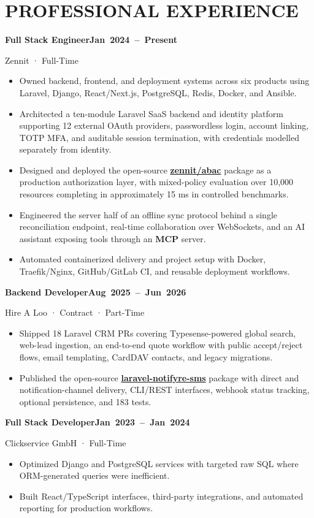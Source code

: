 \documentclass[10pt,a4paper]{article}
\newcommand{\entry}[2]{\Needspace{5\baselineskip}\par\addvspace{5pt}\noindent\textbf{#1}\hfill\mbox{\textbf{#2}}\par}
\newcommand{\job}[3]{\entry{#1}{#2}\vspace{-\parskip}#3\par}
\begin{document}
\section*{PROFESSIONAL EXPERIENCE}
\job{Full Stack Engineer}{Jan 2024 – Present}{Zennit · Full-Time}
\begin{itemize}
  \item Owned backend, frontend, and deployment systems across six products using Laravel, Django, React/Next.js, PostgreSQL, Redis, Docker, and Ansible.
  \item Architected a ten-module Laravel SaaS backend and identity platform supporting 12 external OAuth providers, passwordless login, account linking, TOTP MFA, and auditable session termination, with credentials modelled separately from identity.
  \item Designed and deployed the open-source \textbf{\href{https://github.com/zennit-dev/abac}{zennit/abac}} package as a production authorization layer, with mixed-policy evaluation over 10,000 resources completing in approximately 15 ms in controlled benchmarks.
  \item Engineered the server half of an offline sync protocol behind a single reconciliation endpoint, real-time collaboration over WebSockets, and an AI assistant exposing tools through an \textbf{MCP} server.
  \item Automated containerized delivery and project setup with Docker, Traefik/Nginx, GitHub/GitLab CI, and reusable deployment workflows.
\end{itemize}
\job{Backend Developer}{Aug 2025 – Jun 2026}{Hire A Loo · Contract · Part-Time}
\begin{itemize}
  \item Shipped 18 Laravel CRM PRs covering Typesense-powered global search, web-lead ingestion, an end-to-end quote workflow with public accept/reject flows, email templating, CardDAV contacts, and legacy migrations.
  \item Published the open-source \textbf{\href{https://github.com/magic-systems-io/laravel-notifyre-sms}{laravel-notifyre-sms}} package with direct and notification-channel delivery, CLI/REST interfaces, webhook status tracking, optional persistence, and 183 tests.
\end{itemize}
\job{Full Stack Developer}{Jan 2023 – Jan 2024}{Clickservice GmbH · Full-Time}
\begin{itemize}
  \item Optimized Django and PostgreSQL services with targeted raw SQL where ORM-generated queries were inefficient.
  \item Built React/TypeScript interfaces, third-party integrations, and automated reporting for production workflows.
\end{itemize}
\end{document}
